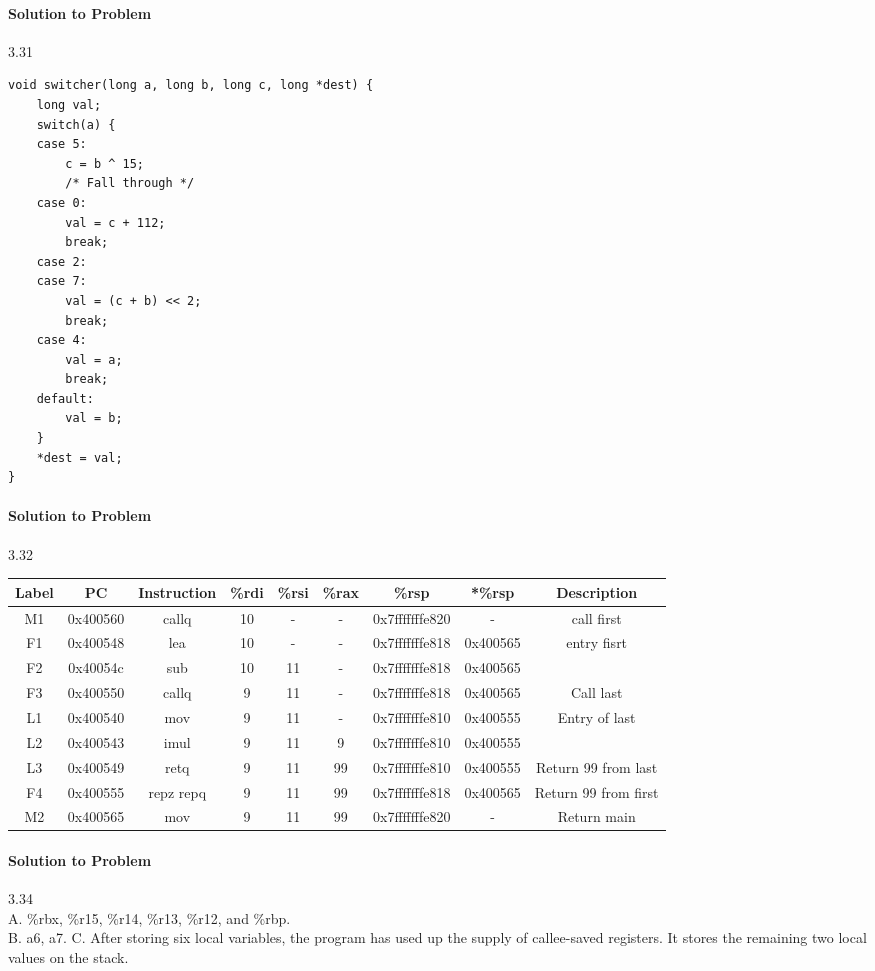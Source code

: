 \documentclass{report}
\begin{document}
\paragraph{Solution to Problem } 3.31 \\
\begin{lstlisting}
void switcher(long a, long b, long c, long *dest) {
    long val;
    switch(a) {
    case 5:
        c = b ^ 15;
        /* Fall through */
    case 0:
        val = c + 112;
        break;
    case 2:
    case 7:
        val = (c + b) << 2;
        break;
    case 4:
        val = a;
        break;
    default:
        val = b;
    }
    *dest = val;
}
\end{lstlisting}


\paragraph{Solution to Problem } 3.32 \\
\begin{center}
\begin{tabular}{ |c|c|c|c|c|c|c|c|c| } 
\hline
Label & PC & Instruction & \%rdi & \%rsi & \%rax & \%rsp &*\%rsp & Description \\
\hline
M1 & 0x400560 & callq & 10 & - & - & 0x7fffffffe820 & - & call first \\
F1 & 0x400548 & lea & 10 & - & - &  0x7fffffffe818 & 0x400565 & entry fisrt \\
F2 & 0x40054c & sub & 10 & 11 & - & 0x7fffffffe818 & 0x400565 & \\
F3 & 0x400550 & callq & 9 & 11 & - & 0x7fffffffe818 & 0x400565 & Call last \\
L1 & 0x400540 & mov & 9 & 11 & - &  0x7fffffffe810 & 0x400555 & Entry of last \\
L2 & 0x400543 & imul & 9 & 11 & 9 & 0x7fffffffe810 & 0x400555 & \\
L3 & 0x400549 & retq & 9 & 11 & 99 & 0x7fffffffe810 & 0x400555 & Return 99 from last \\
F4 & 0x400555 & repz repq & 9 & 11 & 99 & 0x7fffffffe818 & 0x400565 & Return 99 from first \\
M2 & 0x400565 & mov & 9 & 11 & 99 & 0x7fffffffe820 & - & Return main \\
\hline
\end{tabular}
\end{center}

\paragraph{Solution to Problem } 3.34\\
A. \%rbx, \%r15, \%r14, \%r13, \%r12, and \%rbp.\\
B. a6, a7.
C. After storing six local variables, the program has used up the supply of callee-saved registers. It stores the remaining two local values on the stack.
\end{document}
